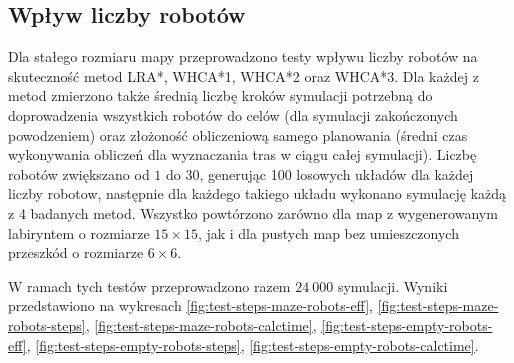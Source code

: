 \subsection{Wpływ liczby robotów} %
\label{ch:tests-function-robots}
Dla stałego rozmiaru mapy przeprowadzono testy wpływu liczby robotów na skuteczność metod LRA*, WHCA*1, WHCA*2 oraz WHCA*3.
Dla każdej z metod zmierzono także średnią liczbę kroków symulacji potrzebną do doprowadzenia wszystkich robotów do celów (dla symulacji zakończonych powodzeniem) oraz złożoność obliczeniową samego planowania (średni czas wykonywania obliczeń dla wyznaczania tras w ciągu całej symulacji).
Liczbę robotów zwiększano od $1$ do $30$, generując 100 losowych układów dla każdej liczby robotow, następnie dla każdego takiego układu wykonano symulację każdą z 4 badanych metod.
Wszystko powtórzono zarówno dla map z wygenerowanym labiryntem o rozmiarze $15 \times 15$, jak i dla pustych map bez umieszczonych przeszkód o rozmiarze $6 \times 6$.

W ramach tych testów przeprowadzono razem $24\ 000$ symulacji.
Wyniki przedstawiono na wykresach \ref{fig:test-steps-maze-robots-eff}, \ref{fig:test-steps-maze-robots-steps}, \ref{fig:test-steps-maze-robots-calctime}, \ref{fig:test-steps-empty-robots-eff}, \ref{fig:test-steps-empty-robots-steps}, \ref{fig:test-steps-empty-robots-calctime}.


